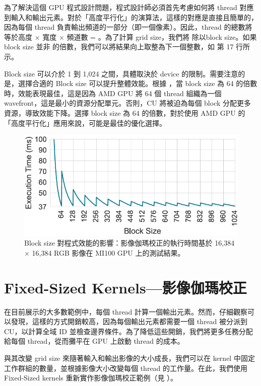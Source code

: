 為了解決這個 GPU 程式設計問題，程式設計師必須首先考慮如何將 thread 對應到輸入和輸出元素。對於「高度平行化」的演算法，這樣的對應是直接且簡單的，因為每個 thread 負責輸出頻道的一部分（即一個像素）。因此，thread 的總數將等於高度 × 寬度 × 頻道數 = 。為了計算 grid size，我們將  除以block size。如果 block size 並非  的倍數，我們可以將結果向上取整為下一個整數，如  第 17 行所示。

Block size 可以介於 1 到 1,024 之間，具體取決於 device 的限制。需要注意的是，選擇合適的 Block size 可以提升整體效能。根據 ，當 block size 為 64 的倍數時，效能表現最佳，這是因為 AMD GPU 將 64 個 thread 組織為一個 wavefront，這是最小的資源分配單元。否則，CU 將被迫為每個 block 分配更多資源，導致效能下降。選擇 block size 為 64 的倍數，對於使用 AMD GPU 的「高度平行化」應用來說，可能是最佳的優化選擇。

\begin{figure}
    \centering
    \includegraphics[width=0.9\linewidth]{FileAusiliari/Screenshots/Figure8-3.png}
    \caption{Block size 對程式效能的影響：影像伽瑪校正的執行時間基於 16,384 × 16,384 RGB 影像在 MI100 GPU 上的測試結果。}
    \label{fig:BlockSize}
\end{figure}

\section{Fixed-Sized Kernels—影像伽瑪校正} \label{sec:fixed_sized_kernels} 
在目前展示的大多數範例中，每個 thread 計算一個輸出元素。然而，仔細觀察可以發現，這樣的方式開銷較高，因為每個輸出元素都需要一個 thread 被分派到 CU，以計算全域 ID 並檢查邊界條件。為了降低這些開銷，我們將更多任務分配給每個 thread，從而攤平在 GPU 上啟動 thread 的成本。

與其改變 grid size 來隨著輸入和輸出影像的大小成長，我們可以在 kernel 中固定工作群組的數量，並根據影像大小改變每個 thread 的工作量。在此，我們使用 Fixed-Sized kernels 重新實作影像伽瑪校正範例（見 ）。

